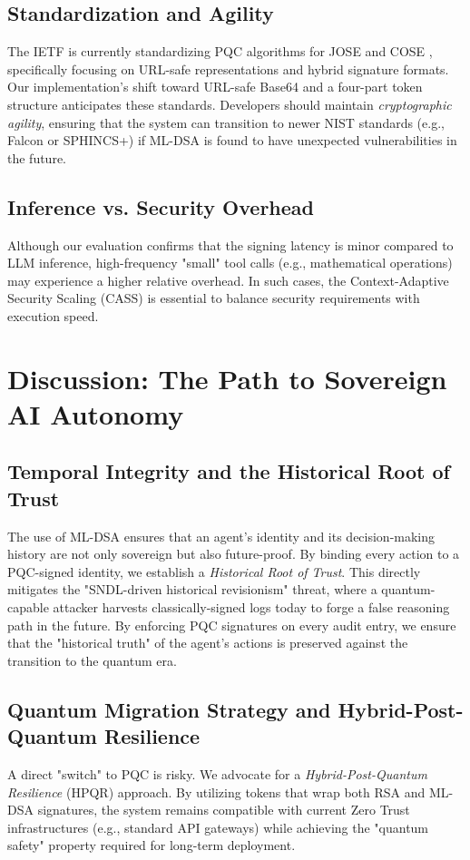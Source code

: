 \documentclass[conference]{IEEEtran}
\begin{document}
\subsection{Standardization and Agility}
The IETF is currently standardizing PQC algorithms for JOSE and COSE \cite{ietfjosepqc}, specifically focusing on URL-safe representations and hybrid signature formats. Our implementation's shift toward URL-safe Base64 and a four-part token structure anticipates these standards. Developers should maintain \textit{cryptographic agility}, ensuring that the system can transition to newer NIST standards (e.g., Falcon or SPHINCS+) if ML-DSA is found to have unexpected vulnerabilities in the future.

\subsection{Inference vs. Security Overhead}
Although our evaluation confirms that the signing latency is minor compared to LLM inference, high-frequency "small" tool calls (e.g., mathematical operations) may experience a higher relative overhead. In such cases, the Context-Adaptive Security Scaling (CASS) is essential to balance security requirements with execution speed.

\section{Discussion: The Path to Sovereign AI Autonomy}

\subsection{Temporal Integrity and the Historical Root of Trust}
The use of ML-DSA ensures that an agent's identity and its decision-making history are not only sovereign but also future-proof. By binding every action to a PQC-signed identity, we establish a \textit{Historical Root of Trust}. This directly mitigates the "SNDL-driven historical revisionism" threat, where a quantum-capable attacker harvests classically-signed logs today to forge a false reasoning path in the future. By enforcing PQC signatures on every audit entry, we ensure that the "historical truth" of the agent's actions is preserved against the transition to the quantum era.

\subsection{Quantum Migration Strategy and Hybrid-Post-Quantum Resilience}
A direct "switch" to PQC is risky. We advocate for a \textit{Hybrid-Post-Quantum Resilience} (HPQR) approach. By utilizing tokens that wrap both RSA and ML-DSA signatures, the system remains compatible with current Zero Trust infrastructures (e.g., standard API gateways) while achieving the "quantum safety" property required for long-term deployment. 
\end{document}
